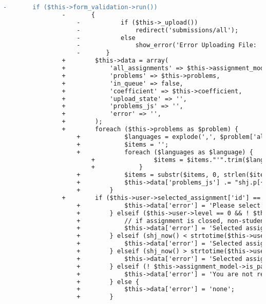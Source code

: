 \begin{lstlisting}[language=diff, caption=Perubahan pada kode Submit.php]
				-		if ($this->form_validation->run())
				-		{
					-			if ($this->_upload())
					-				redirect('submissions/all');
					-			else
					-				show_error('Error Uploading File: '.$this->upload->display_errors());
					-		}
				+        $this->data = array(
				+            'all_assignments' => $this->assignment_model->all_assignments(),
				+            'problems' => $this->problems,
				+            'in_queue' => false,
				+            'coefficient' => $this->coefficient,
				+            'upload_state' => '',
				+            'problems_js' => '',
				+            'error' => '',
				+        );
				+        foreach ($this->problems as $problem) {
					+            $languages = explode(',', $problem['allowed_languages']);
					+            $items = '';
					+            foreach ($languages as $language) {
						+                $items = $items."'".trim($language)."',";
						+            }
					+            $items = substr($items, 0, strlen($items) - 1);
					+            $this->data['problems_js'] .= "shj.p[{$problem['id']}]=[{$items}]; ";
					+        }
				+        if ($this->user->selected_assignment['id'] == 0) {
					+            $this->data['error'] = 'Please select an assignment first.';
					+        } elseif ($this->user->level == 0 && ! $this->user->selected_assignment['open']) {
					+            // if assignment is closed, non-student users (admin, instructors) still can submit
					+            $this->data['error'] = 'Selected assignment is closed.';
					+        } elseif (shj_now() < strtotime($this->user->selected_assignment['start_time'])) {
					+            $this->data['error'] = 'Selected assignment has not started.';
					+        } elseif (shj_now() > strtotime($this->user->selected_assignment['finish_time']) + $this->user->selected_assignment['extra_time']) { // deadline = finish_time + extra_time
					+            $this->data['error'] = 'Selected assignment has finished.';
					+        } elseif (! $this->assignment_model->is_participant($this->user->selected_assignment['participants'], $this->user->username)) {
					+            $this->data['error'] = 'You are not registered for submitting.';
					+        } else {
					+            $this->data['error'] = 'none';
					+        }
				

\end{lstlisting}
